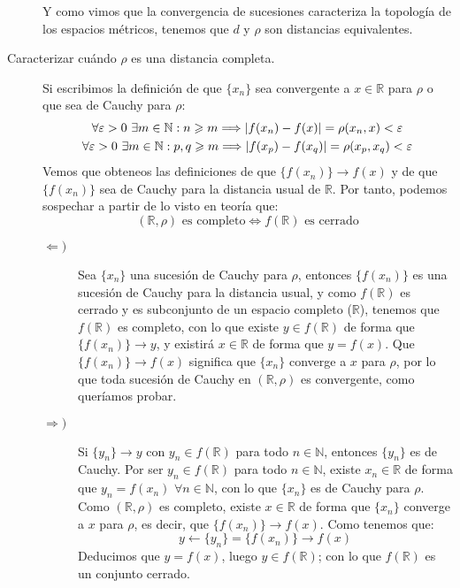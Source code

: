 \begin{ejercicio}
\begin{description}
\begin{itemize}
            \end{itemize}
            Y como vimos que la convergencia de sucesiones caracteriza la topología de los espacios métricos, tenemos que $d$ y $\rho$ son distancias equivalentes.
        \item [Caracterizar cuándo $\rho$ es una distancia completa.] Si escribimos la definición de que $\{x_n\}$ sea convergente a $x\in \mathbb{R}$ para $\rho$ o que sea de Cauchy para $\rho$:
            \begin{gather*}
                \forall \varepsilon > 0~\exists m\in \mathbb{N}:n\geqslant m \Longrightarrow |f(x_n) - f(x)| = \rho(x_n,x) < \varepsilon \\
                \forall \varepsilon > 0~\exists m\in \mathbb{N}:p,q\geqslant m \Longrightarrow |f(x_p) - f(x_q)| = \rho(x_p,x_q) < \varepsilon
            \end{gather*}
            Vemos que obteneos las definiciones de que $\{f(x_n)\}\to f(x)$ y de que $\{f(x_n)\}$ sea de Cauchy para la distancia usual de $\mathbb{R}$. Por tanto, podemos sospechar a partir de lo visto en teoría que:
            \begin{equation*}
                (\mathbb{R}, \rho) \text{\ es completo} \Longleftrightarrow f(\mathbb{R}) \text{\ es cerrado}
            \end{equation*}
            \begin{description}
                \item [$\Longleftarrow)$] Sea $\{x_n\}$ una sucesión de Cauchy para $\rho$, entonces $\{f(x_n)\}$ es una sucesión de Cauchy para la distancia usual, y como $f(\mathbb{R})$ es cerrado y es subconjunto de un espacio completo ($\mathbb{R}$), tenemos que $f(\mathbb{R})$ es completo, con lo que existe $y\in f(\mathbb{R})$ de forma que $\{f(x_n)\} \to y$, y existirá $x\in \mathbb{R}$ de forma que $y = f(x)$. Que $\{f(x_n)\}\to f(x)$ significa que $\{x_n\}$ converge a $x$ para $\rho$, por lo que toda sucesión de Cauchy en $(\mathbb{R},\rho)$ es convergente, como queríamos probar.
                \item [$\Longrightarrow)$] Si $\{y_n\}\to y$ con $y_n\in f(\mathbb{R})$ para todo $n\in \mathbb{N}$, entonces $\{y_n\}$ es de Cauchy. Por ser $y_n \in f(\mathbb{R})$ para todo $n\in \mathbb{N}$, existe $x_n\in \mathbb{R}$ de forma que $y_n = f(x_n)$ $\forall n\in \mathbb{N}$, con lo que $\{x_n\}$ es de Cauchy para $\rho$. Como $(\mathbb{R},\rho)$ es completo, existe $x\in \mathbb{R}$ de forma que $\{x_n\}$ converge a $x$ para $\rho$, es decir, que $\{f(x_n)\} \to f(x)$. Como tenemos que:
                    \begin{equation*}
                        y \leftarrow \{y_n\} = \{f(x_n)\} \to f(x)
                    \end{equation*}
                    Deducimos que $y = f(x)$, luego $y\in f(\mathbb{R})$; con lo que $f(\mathbb{R})$ es un conjunto cerrado.
            \end{description}
    \end{description}
    \end{ejercicio}
    

